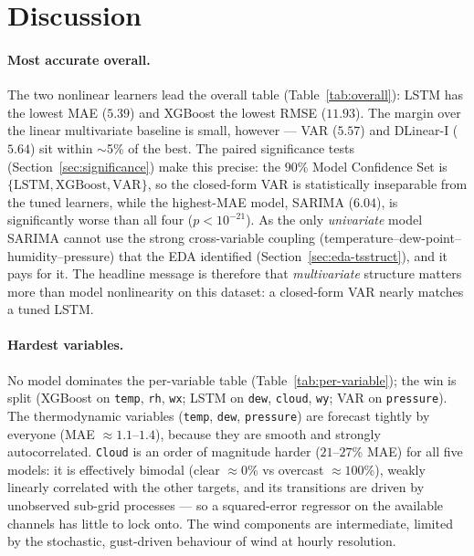 \documentclass[12pt,a4paper,oneside]{report}
\begin{document}
\section{Discussion}

\paragraph{Most accurate overall.} The two nonlinear learners lead the overall
table (Table~\ref{tab:overall}): LSTM has the lowest MAE ($5.39$) and XGBoost the
lowest RMSE ($11.93$). The margin over the linear multivariate baseline is small,
however --- VAR ($5.57$) and DLinear-I ($5.64$) sit within $\sim$5\% of the best.
The paired significance tests (Section~\ref{sec:significance}) make this precise:
the $90\%$ Model Confidence Set is $\{\text{LSTM},\text{XGBoost},\text{VAR}\}$, so
the closed-form VAR is statistically inseparable from the tuned learners, while
the highest-MAE model, SARIMA ($6.04$), is significantly worse than all four
($p<10^{-21}$). As the only \emph{univariate} model SARIMA cannot use the strong
cross-variable coupling (temperature--dew-point--humidity--pressure) that the
EDA identified (Section~\ref{sec:eda-tsstruct}), and it pays for it. The headline
message is therefore that \emph{multivariate} structure matters more than model
nonlinearity on this dataset: a closed-form VAR nearly matches a tuned LSTM.

\paragraph{Hardest variables.} No model dominates the per-variable table
(Table~\ref{tab:per-variable}); the win is split (XGBoost on \texttt{temp},
\texttt{rh}, \texttt{wx}; LSTM on \texttt{dew}, \texttt{cloud}, \texttt{wy}; VAR
on \texttt{pressure}). The thermodynamic variables (\texttt{temp}, \texttt{dew},
\texttt{pressure}) are forecast tightly by everyone (MAE $\approx 1.1$--$1.4$),
because they are smooth and strongly autocorrelated. \texttt{Cloud} is an order of
magnitude harder ($21$--$27$\% MAE) for all five models: it is effectively
bimodal (clear $\approx 0$\% vs overcast $\approx 100$\%), weakly linearly
correlated with the other targets, and its transitions are driven by
unobserved sub-grid processes --- so a squared-error regressor on the available
channels has little to lock onto. The wind components are intermediate, limited by
the stochastic, gust-driven behaviour of wind at hourly resolution.
\end{document}

